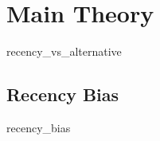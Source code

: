 \documentclass[hyphens, crop=false]{standalone}
\begin{document}
	\section*{Main Theory}
	
	
	{recency_vs_alternative}
	
		\subsection*{Recency Bias}
			{recency_bias}
%		
%		
%		
			
%		
%		
		
%		
%		
	
	\newpage
	\printbibliography
			
\end{document}
